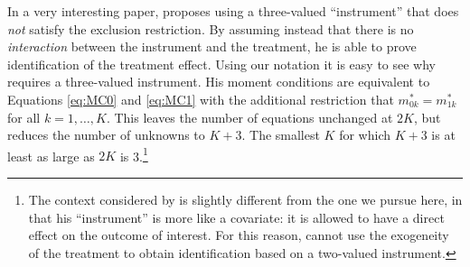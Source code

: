 In a very interesting paper, \cite{Lewbel} proposes using a three-valued ``instrument'' that does \emph{not} satisfy the exclusion restriction.
By assuming instead that there is no \emph{interaction} between the instrument and the treatment, he is able to prove identification of the treatment effect.
Using our notation it is easy to see why \cite{Lewbel} requires a three-valued instrument. 
His moment conditions are equivalent to Equations \ref{eq:MC0} and \ref{eq:MC1} with the additional restriction that $m^*_{0k} = m^*_{1k}$ for all $k= 1, \dots, K$.
This leaves the number of equations unchanged at $2K$, but reduces the number of unknowns to $K+3$.
The smallest $K$ for which $K+3$ is at least as large as $2K$ is 3.\footnote{The context considered by \cite{Lewbel} is slightly different from the one we pursue here, in that his ``instrument'' is more like a covariate: it is allowed to have a direct effect on the outcome of interest.  For this reason, \cite{Lewbel} cannot use the exogeneity of the treatment to obtain identification based on a two-valued instrument.}

